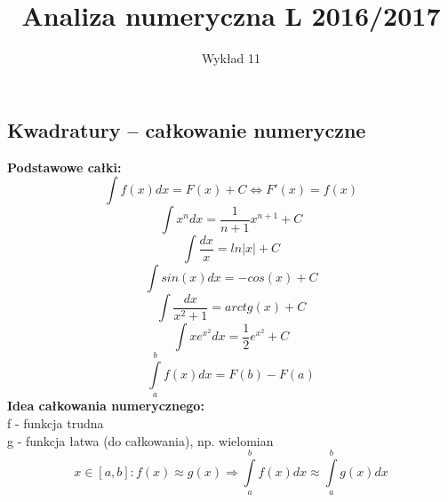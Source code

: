 \documentclass[12pt]{article}
\author{\LARGE Wykład 11}
\title{\bfseries\Huge Analiza numeryczna L 2016/2017}
\date{}
\begin{document}
\maketitle
\begin{center}
\section*{\Large Kwadratury -- całkowanie numeryczne }

\end{center}
\vspace{5mm}
\textbf{Podstawowe całki:}\\
$$ \int f(x)dx = F(x) + C \Leftrightarrow F'(x) = f(x)  $$
$$ \int x^ndx = \frac{1}{n+1}x^{n+1} + C $$
$$ \int \frac{dx}{x} = ln|x| +C $$
$$ \int sin(x)dx = -cos(x) + C $$
$$ \int \frac{dx}{x^2 + 1} = arctg(x) +C$$
$$ \int xe^{x^2}dx = \frac{1}{2}e^{x^2} + C $$
$$ \int\limits_{a}^{b}f(x)dx = F(b) - F(a) $$
\textbf{Idea całkowania numerycznego:}\\
f - funkcja trudna\\
g - funkcja łatwa (do całkowania), np. wielomian\\
$$ x \in [a,b]: f(x) \approx g(x) \Rightarrow \int\limits_{a}^{b}f(x)dx \approx \int\limits_{a}^{b}g(x)dx $$
\newpage
\end{document}
